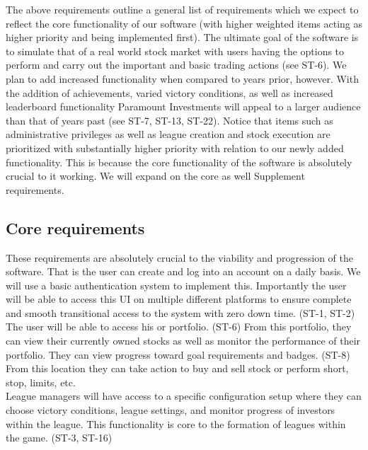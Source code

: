 The above requirements outline a general list of requirements which we expect to reflect
the core functionality of our software (with higher weighted items acting as higher priority
and being implemented first). The ultimate goal of the software is to simulate that of a
real world stock market with users having the options to perform and carry out the important
and basic trading actions (see ST-6). We plan to add increased functionality when compared to
years prior, however. With the addition of achievements, varied victory conditions, as well
as increased leaderboard functionality Paramount Investments will appeal to a larger audience
than that of years past (see ST-7, ST-13, ST-22). Notice that items such as administrative
privileges as well as league creation and stock execution are prioritized with substantially
higher priority with relation to our newly added functionality. This is because the core
functionality of the software is absolutely crucial to it working. We will expand on the
core as well Supplement requirements.\\

\subsection{Core requirements}

These requirements are absolutely crucial to the viability and progression of the software.
That is the user can create and log into an account on a daily basis. We will use a basic
authentication system to implement this. Importantly the user will be able to access this
UI on multiple different platforms to ensure complete and smooth transitional access to the
system with zero down time. (ST-1, ST-2) \\

The user will be able to access his or portfolio. (ST-6) From this portfolio, they can view
their currently owned stocks as well as monitor the performance of their portfolio. They can
view progress toward goal requirements and badges. (ST-8) From this location they can take
action to buy and sell stock or perform short, stop, limits, etc. \\

League managers will have access to a specific configuration setup where they can choose
victory conditions, league settings, and monitor progress of investors within the league.
This functionality is core to the formation of leagues within the game. (ST-3, ST-16)\\

